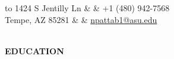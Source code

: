 \documentclass[11pt,a3]{article}
\def\hrulefill{\leavevmode\leaders\hrule height 1pt\hfill\kern 0pt}		%
\begin{document}
{\selectfont	
	\renewcommand{\familydefault}{\sfdefault}

	\noindent
	\begin{tabu} to \textwidth {X[l] X[c] X[r]}
		1424 S Jentilly Ln  &    &  +1 (480) 942-7568 		\\
		Tempe, AZ 85281 &	&   \textcolor{blue} {\href{mailto:npattab1@asu.edu}{npattab1@asu.edu}}	\\
		  \\
	\end{tabu}

	

	\vspace{-2mm}

		
		
		
	
	\begin{flushleft}
	{\Large \textbf{EDUCATION}} %
		
		\vspace{1.5mm}


\end{flushleft}}
\end{document}
